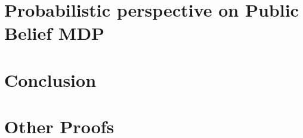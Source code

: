\documentclass{report}
\begin{document}
\chapter{Probabilistic perspective on Public Belief MDP}

\chapter{Conclusion}

\appendix

% 



\chapter{Other Proofs}


% 
\end{document}

